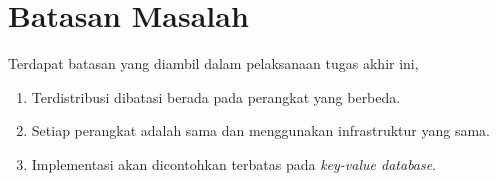 \section{Batasan Masalah}
\label{sec:batasan-masalah}

Terdapat batasan yang diambil dalam pelaksanaan tugas akhir ini,

\begin{enumerate}
    \item Terdistribusi dibatasi berada pada perangkat yang berbeda.
    \item Setiap perangkat adalah sama dan menggunakan infrastruktur yang sama.
    \item Implementasi akan dicontohkan terbatas pada \textit{key-value database}.
\end{enumerate}
  